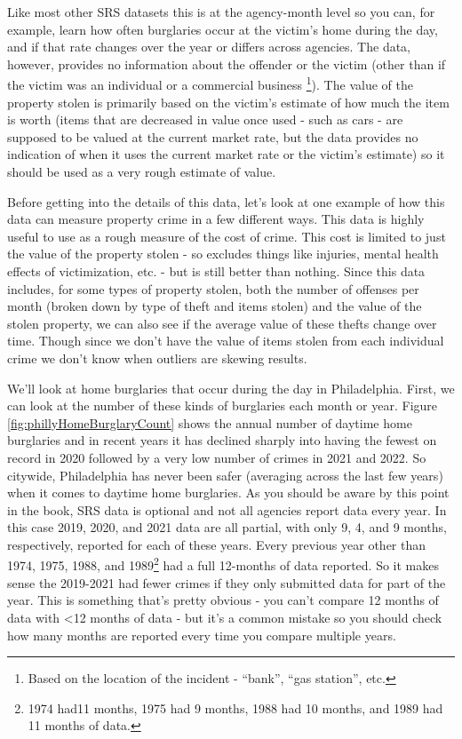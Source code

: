 \documentclass[
]{krantz}
\begin{document}
Like most other SRS datasets this is at the agency-month
level so you can, for example, learn how often burglaries
occur at the victim's home during the day, and if that rate
changes over the year or differs across agencies. The data,
however, provides no information about the offender or the
victim (other than if the victim was an individual or a
commercial business \footnote{Based on the location of the
  incident - ``bank'', ``gas station'', etc.}). The value of
the property stolen is primarily based on the victim's
estimate of how much the item is worth (items that are
decreased in value once used - such as cars - are supposed
to be valued at the current market rate, but the data
provides no indication of when it uses the current market
rate or the victim's estimate) so it should be used as a
very rough estimate of value.

Before getting into the details of this data, let's look at
one example of how this data can measure property crime in a
few different ways. This data is highly useful to use as a
rough measure of the cost of crime. This cost is limited to
just the value of the property stolen - so excludes things
like injuries, mental health effects of victimization, etc.
- but is still better than nothing. Since this data
includes, for some types of property stolen, both the number
of offenses per month (broken down by type of theft and
items stolen) and the value of the stolen property, we can
also see if the average value of these thefts change over
time. Though since we don't have the value of items stolen
from each individual crime we don't know when outliers are
skewing results.

We'll look at home burglaries that occur during the day in
Philadelphia. First, we can look at the number of these
kinds of burglaries each month or year. Figure
\ref{fig:phillyHomeBurglaryCount} shows the annual number of
daytime home burglaries and in recent years it has declined
sharply into having the fewest on record in 2020 followed by
a very low number of crimes in 2021 and 2022. So citywide,
Philadelphia has never been safer (averaging across the last
few years) when it comes to daytime home burglaries. As you
should be aware by this point in the book, SRS data is
optional and not all agencies report data every year. In
this case 2019, 2020, and 2021 data are all partial, with
only 9, 4, and 9 months, respectively, reported for each of
these years. Every previous year other than 1974, 1975,
1988, and 1989\footnote{1974 had11 months, 1975 had 9
  months, 1988 had 10 months, and 1989 had 11 months of
  data.} had a full 12-months of data reported. So it makes
sense the 2019-2021 had fewer crimes if they only submitted
data for part of the year. This is something that's pretty
obvious - you can't compare 12 months of data with
\textless12 months of data - but it's a common mistake so
you should check how many months are reported every time you
compare multiple years.
\end{document}
